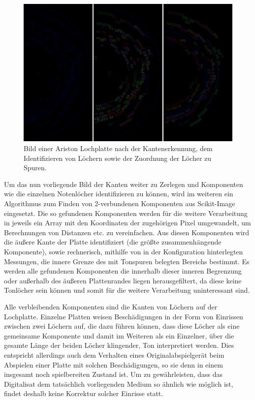 \begin{figure}[t]
    \centering
    \includegraphics[width=\textwidth]{graphics/processing.png}
    \caption{Bild einer Ariston Lochplatte nach der Kantenerkennung, dem Identifizieren von Löchern sowie der Zuordnung der Löcher zu Spuren.}
    \label{pipelinesteps}
\end{figure}

Um das nun vorliegende Bild der Kanten weiter zu Zerlegen und Komponenten wie die einzelnen Notenlöcher identifizieren zu können, wird im weiteren ein Algorithmus zum Finden von 2-verbundenen Komponenten aus Scikit-Image \parencite[]{scikit-image} eingesetzt.
Die so gefundenen Komponenten werden für die weitere Verarbeitung in jeweils ein Array mit den Koordinaten der zugehörigen Pixel umgewandelt, um Berechnungen von Distanzen etc. zu vereinfachen.
Aus diesen Komponenten wird die äußere Kante der Platte identifiziert (die größte zusammenhängende Komponente), sowie rechnerisch, mithilfe von in der Konfiguration hinterlegten Messungen, die innere Grenze des mit Tonspuren belegten Bereichs bestimmt.
Es werden alle gefundenen Komponenten die innerhalb dieser inneren Begrenzung oder außerhalb des äußeren Plattenrandes liegen herausgefiltert, da diese keine Tonlöcher sein können und somit für die weitere Verarbeitung uninteressant sind.

Alle verbleibenden Komponenten sind die Kanten von Löchern auf der Lochplatte.
Einzelne Platten weisen Beschädigungen in der Form von Einrissen zwischen zwei Löchern auf, die dazu führen können, dass diese Löcher als eine gemeinsame Komponente und damit im Weiteren als ein Einzelner, über die gesamte Länge der beiden Löcher klingender, Ton interpretiert werden.
Dies entspricht allerdings auch dem Verhalten eines Originalabspielgerät beim Abspielen einer Platte mit solchen Beschädigungen, so sie denn in einem insgesamt noch spielbereiten Zustand ist.
Um zu gewährleisten, dass das Digitalisat dem tatsächlich vorliegenden Medium so ähnlich wie möglich ist, findet deshalb keine Korrektur solcher Einrisse statt.

